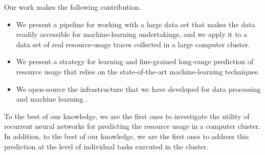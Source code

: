 Our work makes the following contribution.
\begin{itemize}
\item We present a pipeline for working with a large data set that makes the
data readily accessible for machine-learning undertakings, and we apply it to a
data set of real resource-usage traces collected in a large computer cluster.

\item We present a strategy for learning and fine-grained long-range prediction
of resource usage that relies on the state-of-the-art machine-learning
techniques.

\item We open-source the infrastructure that we have developed for data
processing and machine learning \cite{sources}.
\end{itemize}

To the best of our knowledge, we are the first ones to investigate the utility
of recurrent neural networks for predicting the resource usage in a computer
cluster. In addition, to the best of our knowledge, we are the first ones to
address this prediction at the level of individual tasks executed in the
cluster.
